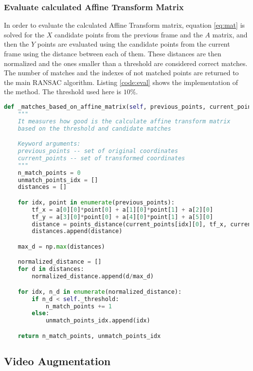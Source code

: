 \documentclass[]{IEEEtran}
\begin{document}
\subsubsection{Evaluate calculated Affine Transform Matrix}
In order to evaluate the calculated Affine Transform matrix, equation \ref{eq:mat} is solved for the $X$ candidate points from the previous frame and the $A$ matrix, and then the $Y$ points are evaluated using the candidate points from the current frame using the distance between each of them. These distances are then normalized and the ones smaller than a threshold are considered correct matches. The number of matches and the indexes of not matched points are returned to the main RANSAC algorithm. Listing \ref{code:eval} shows the implementation of the method. The threshold used here is $10\%$.

\begin{lstlisting}[language=Python, caption={Evaluates calculated Affine Transform matrix}, label={code:eval}]
  def _matches_based_on_affine_matrix(self, previous_points, current_points, a):
    """
    It measures how good is the calculate affine transform matrix
    based on the threshold and candidate matches

    Keyword arguments:
    previous_points -- set of original coordinates
    current_points -- set of transformed coordinates
    """
    n_match_points = 0
    unmatch_points_idx = []
    distances = []

    for idx, point in enumerate(previous_points):
        tf_x = a[0][0]*point[0] + a[1][0]*point[1] + a[2][0]
        tf_y = a[3][0]*point[0] + a[4][0]*point[1] + a[5][0]
        distance = points_distance(current_points[idx][0], tf_x, current_points[idx][1], tf_y)
        distances.append(distance)

    max_d = np.max(distances)

    normalized_distance = []
    for d in distances:
        normalized_distance.append(d/max_d)

    for idx, n_d in enumerate(normalized_distance):
        if n_d < self._threshold:
            n_match_points += 1
        else:
            unmatch_points_idx.append(idx)

    return n_match_points, unmatch_points_idx
\end{lstlisting}


\subsection{Video Augmentation}
\end{document}
